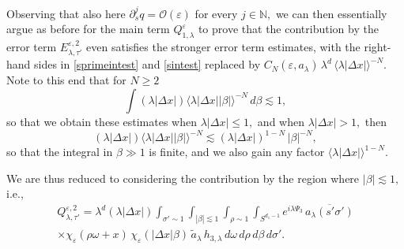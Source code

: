 \documentclass[leqno]{amsart}
\theoremstyle{definition}
\theoremstyle{remark}
\numberwithin{equation}{section}
\newcommand{\N}{\mathbb{N}}
\newcommand{\jp}[1]{\langle{#1}\rangle}
\newcommand\la{{\lambda}}
\newcommand\ve{{\varepsilon}}
\begin{document}
Observing  that  also here $\partial^j_s q=\mathcal O(\ve)$ for every $j\in\N,$ we can then essentially argue  as before for the main term  $Q^\ve_{1,\la}$ to prove that the contribution by the error term $E^{\varepsilon,2}_{\lambda,\tau'}$ even  satisfies  the stronger error term estimates,  with the right-hand sides in \eqref{sprimeintest} and \eqref{sintest} replaced by 
$C_N(\ve,a_\la)\, \lambda^d\, \langle\lambda\left|\Delta x\right|\rangle^{-N}.$ Note to this end that  for $N\ge2$
$$
\int(\la |\Delta x|)\jp{\lambda|\Delta x||\beta|}^{-N}\, d\beta\lesssim 1,
$$
 so that we obtain these estimates when  $\la |\Delta x|\le 1,$ and when $\la |\Delta x|>1,$ then  
$$
(\la |\Delta x|)\jp{\lambda|\Delta x||\beta|}^{-N}\lesssim (\la |\Delta x|)^{1-N} \,|\beta|^{-N},
$$ 
so that the integral in $\beta\gg 1$ is finite, and we  also gain any factor  $\langle\la |\Delta x|\rangle^{1-N}.$
\smallskip

We are thus reduced to considering the contribution by the  region where $|\beta|\lesssim 1,$ i.e., 
\begin{multline*}
Q^{\varepsilon,2}_{\lambda,\tau'}=\lambda^d (\la |\Delta x|) \int_{\sigma' \sim 1} \int_{|\beta|\lesssim 1}  \int_{\rho \sim 1}  \int_{S^{d_1-1}} e^{i\lambda \Psi_3}  \,\overline{a_\lambda(s'\sigma')} \\ 
 \times \chi_{\varepsilon}(\rho\omega + x) 
\, \chi_\ve(\left|\Delta x\right|\beta)\,\tilde a_\la \, h_{3,\lambda}\,d\omega \, d\rho  \, d\beta \, d\sigma' .
\end{multline*}
\end{document}
